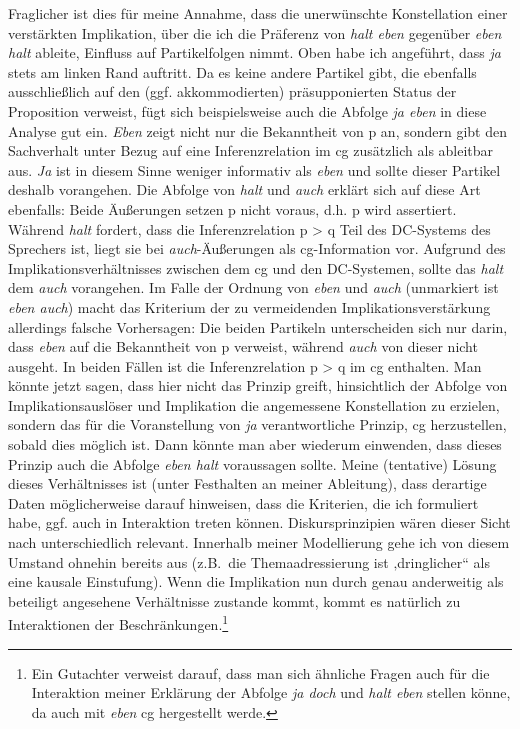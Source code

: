 Fraglicher ist dies für meine Annahme, dass die unerwünschte Konstellation einer verstärkten Implikation, über die ich die Präferenz von \textit{halt eben} gegenüber \textit{eben halt} ableite, Einfluss auf Partikelfolgen nimmt. Oben habe ich angeführt, dass \textit{ja} stets am linken Rand auftritt. Da es keine andere Partikel gibt, die ebenfalls ausschließlich auf den (ggf. akkommodierten) präsupponierten Status der Proposition verweist, fügt sich beispielsweise auch die Abfolge \textit{ja eben} in diese Analyse gut ein. \textit{Eben} zeigt nicht nur die Bekanntheit von p an, sondern gibt den Sachverhalt unter Bezug auf eine Inferenzrelation im cg zusätzlich als ableitbar aus. \textit{Ja} ist in diesem Sinne weniger informativ als \textit{eben} und sollte dieser Partikel deshalb vorangehen. Die Abfolge von \textit{halt} und \textit{auch} erklärt sich auf diese Art ebenfalls: Beide Äußerungen setzen p nicht voraus, d.h. p wird assertiert. Während \textit{halt} fordert, dass die Inferenzrelation p > q Teil des DC-Systems des Sprechers ist, liegt sie bei \textit{auch}-Äußerungen als cg-Information vor. Aufgrund des Implikationsverhältnisses zwischen dem cg und den DC-Systemen, sollte das \textit{halt} dem \textit{auch} vorangehen. Im Falle der Ordnung von \textit{eben} und \textit{auch} (unmarkiert ist \textit{eben auch}) macht das Kriterium der zu vermeidenden Implikationsverstärkung allerdings falsche Vorhersagen: Die beiden Partikeln unterscheiden sich nur darin, dass \textit{eben} auf die Bekanntheit von p verweist, während \textit{auch} von dieser nicht ausgeht. In beiden Fällen ist die Inferenzrelation p > q im cg enthalten. Man könnte jetzt sagen, dass hier nicht das Prinzip greift, hinsichtlich der Abfolge von Implikationsauslöser und Implikation die angemessene Konstellation zu erzielen, sondern das für die Voranstellung von \textit{ja} verantwortliche Prinzip, cg herzustellen, sobald dies möglich ist. Dann könnte man aber wiederum einwenden, dass dieses Prinzip auch die Abfolge \textit{eben halt} voraussagen sollte. Meine (tentative) Lösung dieses Verhältnisses ist (unter Festhalten an meiner Ableitung), dass derartige Daten möglicherweise darauf hinweisen, dass die Kriterien, die ich formuliert habe, ggf. auch in Interaktion treten können. Diskursprinzipien wären dieser Sicht nach unterschiedlich relevant. Innerhalb meiner Modellierung gehe ich von diesem Umstand ohnehin bereits aus (z.B.\ die Themaadressierung ist ‚dringlicher“ als eine kausale Einstufung). Wenn die Implikation nun durch genau anderweitig als beteiligt angesehene Verhältnisse zustande kommt, kommt es natürlich zu Interaktionen der Beschränkungen.\footnote{Ein Gutachter verweist darauf, dass man sich ähnliche Fragen auch für die Interaktion meiner Erklärung der Abfolge \textit{ja doch} und \textit{halt eben} stellen könne, da auch mit \textit{eben} cg hergestellt werde.}

